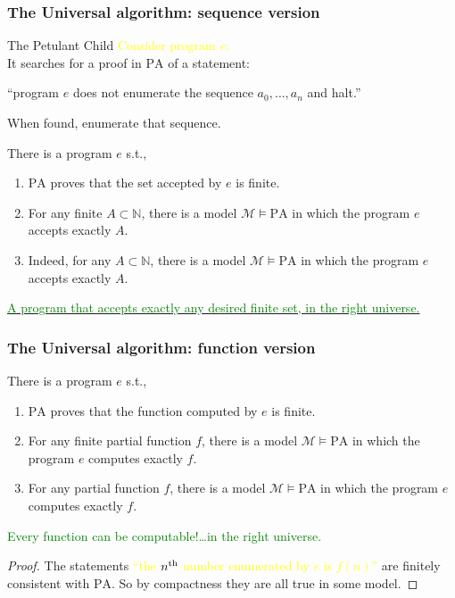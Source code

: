 \documentclass[UTF8,aspectratio=43,11pt,colorlinks,compress,openany]{beamer}%
\begin{document}
\begin{frame}\frametitle{The Universal algorithm: sequence version}
\begin{block}{The Petulant Child}
\textcolor{yellow}{Consider program $e$:}\\
It searches for a proof in $\mathrm{PA}$ of a statement:\\
\centerline{``program $e$ does not enumerate the sequence $a_0,\dots,a_n$ and halt.''}
When found, enumerate that sequence.
\end{block}
\begin{theorem}
There is a program $e$ s.t.,
\begin{enumerate}
	\item $\mathrm{PA}$ proves that the set accepted by $e$ is finite.
	\item For any finite $A\subset\mathbb{N}$, there is a model $\mathcal{M}\vDash\mathrm{PA}$ in which the program $e$ accepts exactly $A$.
	\item Indeed, for any $A\subset\mathbb{N}$, there is a model $\mathcal{M}\vDash\mathrm{PA}$ in which the program $e$ accepts exactly $A$.
\end{enumerate}
\end{theorem}
\href{http://jdh.hamkins.org/a-program-that-accepts-any-desired-finite-set-in-the-right-universe/}{\textcolor{green}{A program that accepts exactly any desired finite set, in the right universe.}}
\end{frame}

\begin{frame}\frametitle{The Universal algorithm: function version}
\begin{theorem}
There is a program $e$ s.t.,
\begin{enumerate}
	\item $\mathrm{PA}$ proves that the function computed by $e$ is finite.
	\item For any finite partial function $f$, there is a model $\mathcal{M}\vDash\mathrm{PA}$ in which the program $e$ computes exactly $f$.
	\item For any partial function $f$, there is a model $\mathcal{M}\vDash\mathrm{PA}$ in which the program $e$ computes exactly $f$.
\end{enumerate}
\end{theorem}
\textcolor{green}{Every function can be computable!\dots in the right universe.}
\begin{proof}
The statements \textcolor{yellow}{``the $n\textsuperscript{th}$ number enumerated by $e$ is $f(n)$''} are finitely consistent with $\mathrm{PA}$. So by compactness they are all true in some model.
\end{proof}
\end{frame}
\end{document}
